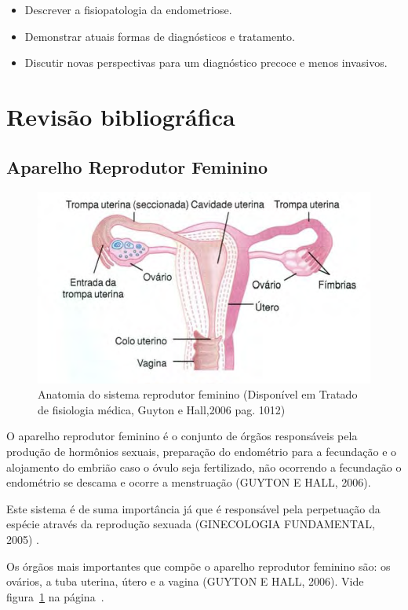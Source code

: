 \documentclass[12pt]{article} %
\begin{document}
\begin{itemize}
\item Descrever a fisiopatologia da endometriose.
\item Demonstrar atuais formas de diagnósticos e tratamento.
\item Discutir novas perspectivas para um diagnóstico precoce e menos
invasivos.
\end{itemize}


\section{Revisão bibliográfica}

\subsection{Aparelho Reprodutor Feminino}
\begin{figure}[h!]
\centering
\includegraphics[width=13.9cm]{utero.png}
\caption[Anatomia do sistema reprodutor feminino]{Anatomia do sistema reprodutor feminino (Disponível em Tratado de fisiologia médica, Guyton e Hall,2006 pag. 1012)}
\label{fig:aparelho feminino}
\end{figure}

O aparelho reprodutor feminino é o conjunto de órgãos responsáveis
pela produção de hormônios sexuais, preparação do
endométrio para a fecundação e o alojamento do embrião caso o óvulo seja
fertilizado, não ocorrendo a fecundação o endométrio se descama e ocorre a menstruação (GUYTON E HALL, 2006). 

Este sistema é de suma
importância já que é responsável pela perpetuação da espécie através
da reprodução sexuada (GINECOLOGIA FUNDAMENTAL, 2005) .

Os órgãos mais importantes que compõe o
aparelho reprodutor feminino são: os ovários, a tuba uterina, útero e
a vagina (GUYTON E HALL, 2006). Vide figura~\ref{fig:aparelho feminino}
na página~\pageref{fig:aparelho feminino}.
\end{document}
